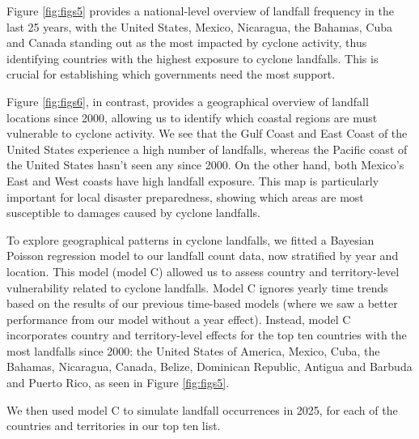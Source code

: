 \documentclass[
]{article}
\begin{document}
Figure \ref{fig:figs5} provides a national-level overview of landfall frequency in the last 25 years, with the United States, Mexico, Nicaragua, the Bahamas, Cuba and Canada standing out as the most impacted by cyclone activity, thus identifying countries with the highest exposure to cyclone landfalls. This is crucial for establishing which governments need the most support.

\newpage

Figure \ref{fig:figs6}, in contrast, provides a geographical overview of landfall locations since 2000, allowing us to identify which coastal regions are must vulnerable to cyclone activity. We see that the Gulf Coast and East Coast of the United States experience a high number of landfalls, whereas the Pacific coast of the United States hasn't seen any since 2000. On the other hand, both Mexico's East and West coasts have high landfall exposure. This map is particularly important for local disaster preparedness, showing which areas are most susceptible to damages caused by cyclone landfalls.

To explore geographical patterns in cyclone landfalls, we fitted a Bayesian Poisson regression model to our landfall count data, now stratified by year and location. This model (model C) allowed us to assess country and territory-level vulnerability related to cyclone landfalls. Model C ignores yearly time trends based on the results of our previous time-based models (where we saw a better performance from our model without a year effect). Instead, model C incorporates country and territory-level effects for the top ten countries with the most landfalls since 2000: the United States of America, Mexico, Cuba, the Bahamas, Nicaragua, Canada, Belize, Dominican Republic, Antigua and Barbuda and Puerto Rico, as seen in Figure \ref{fig:figs5}.

We then used model C to simulate landfall occurrences in 2025, for each of the countries and territories in our top ten list.
\end{document}
